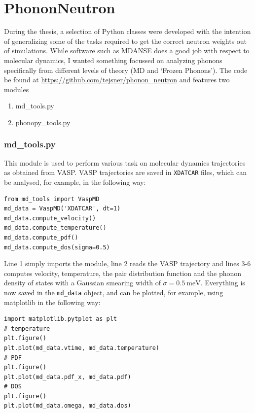 \lstset{breaklines=true, frame=single, language=Python, numbers=left, basicstyle=\ttfamily}
\chapter{PhononNeutron}\label{app:software}
During the thesis, a selection of Python classes were developed with the intention of generalizing some of the tasks required to get the correct neutron weights out of simulations. While software such as MDANSE \cite{Goret2017} does a good job with respect to molecular dynamics, I wanted something focussed on analyzing phonons specifically from different levels of theory (MD and `Frozen Phonons'). The code be found at \url{https://github.com/tejsner/phonon_neutron} and features two modules

\begin{enumerate}
    \item md\_tools.py
    \item phonopy\_tools.py
\end{enumerate}

\subsection{md\_tools.py}
This module is used to perform various task on molecular dynamics trajectories as obtained from VASP. VASP trajectories are saved in \texttt{XDATCAR} files, which can be analysed, for example, in the following way:

\vspace{1em}
\begin{lstlisting}
from md_tools import VaspMD
md_data = VaspMD('XDATCAR', dt=1)
md_data.compute_velocity()
md_data.compute_temperature()
md_data.compute_pdf()
md_data.compute_dos(sigma=0.5)
\end{lstlisting}
\vspace{1em}

\noindent Line 1 simply imports the module, line 2 reads the VASP trajectory and lines 3-6 computes velocity, temperature, the pair distribution function and the phonon density of states with a Gaussian smearing width of $\sigma = \SI{0.5}{\milli\eV}$. Everything is now saved in the \texttt{md\_data} object, and can be plotted, for example, using matplotlib in the following way:

\vspace{1em}
\begin{lstlisting}
import matplotlib.pytplot as plt
# temperature
plt.figure()
plt.plot(md_data.vtime, md_data.temperature)
# PDF
plt.figure()
plt.plot(md_data.pdf_x, md_data.pdf)
# DOS
plt.figure()
plt.plot(md_data.omega, md_data.dos)
\end{lstlisting}
\vspace{1em}

